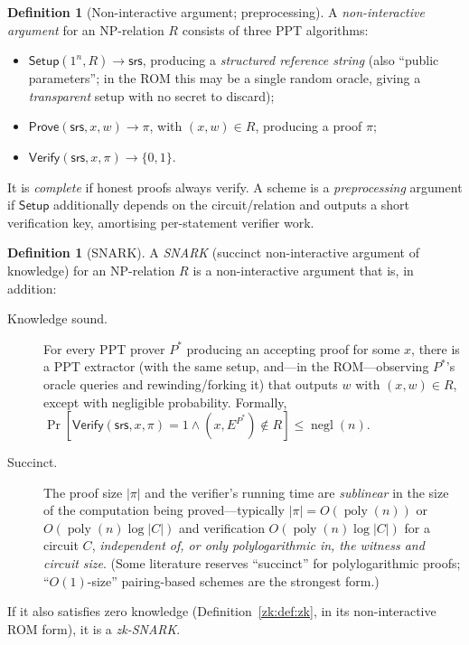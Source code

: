 \documentclass[11pt,a4paper]{article}
\theoremstyle{definition}
\newtheorem{definition}[theorem]{Definition}
\theoremstyle{remark}
\DeclareMathOperator{\negl}{negl}
\DeclareMathOperator{\poly}{poly}
\begin{document}
\begin{definition}[Non-interactive argument; preprocessing]\label{zk:def:nizk}
A \emph{non-interactive argument} for an \textsf{NP}-relation \(R\) consists of three PPT algorithms:
\begin{itemize}
  \item \(\mathsf{Setup}(1^n, R) \to \mathsf{srs}\), producing a \emph{structured reference string} (also ``public parameters''; in the ROM this may be a single random oracle, giving a \emph{transparent} setup with no secret to discard);
  \item \(\mathsf{Prove}(\mathsf{srs}, x, w) \to \pi\), with \((x,w)\in R\), producing a proof \(\pi\);
  \item \(\mathsf{Verify}(\mathsf{srs}, x, \pi) \to \{0,1\}\).
\end{itemize}
It is \emph{complete} if honest proofs always verify. A scheme is a \emph{preprocessing} argument if \(\mathsf{Setup}\) additionally depends on the circuit/relation and outputs a short verification key, amortising per-statement verifier work.
\end{definition}

\begin{definition}[SNARK]\label{zk:def:snark}
A \emph{SNARK} (succinct non-interactive argument of knowledge) for an \textsf{NP}-relation \(R\) is a non-interactive argument that is, in addition:
\begin{description}
  \item[Knowledge sound.] For every PPT prover \(P^*\) producing an accepting proof for some \(x\), there is a PPT extractor (with the same setup, and---in the ROM---observing \(P^*\)'s oracle queries and rewinding/forking it) that outputs \(w\) with \((x,w)\in R\), except with negligible probability. Formally, \(\Pr[\mathsf{Verify}(\mathsf{srs},x,\pi)=1 \wedge (x, E^{P^*}) \notin R] \le \negl(n)\).
  \item[Succinct.] The proof size \(|\pi|\) and the verifier's running time are \emph{sublinear} in the size of the computation being proved---typically \(|\pi| = O(\poly(n))\) or \(O(\poly(n)\log |C|)\) and verification \(O(\poly(n)\log |C|)\) for a circuit \(C\), \emph{independent of, or only polylogarithmic in, the witness and circuit size}. (Some literature reserves ``succinct'' for polylogarithmic proofs; ``\(O(1)\)-size'' pairing-based schemes are the strongest form.)
\end{description}
If it also satisfies zero knowledge (Definition~\ref{zk:def:zk}, in its non-interactive ROM form), it is a \emph{zk-SNARK}.
\end{definition}
\end{document}
